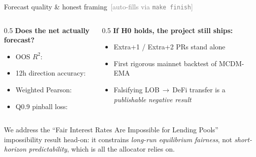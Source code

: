\documentclass[aspectratio=169,11pt]{beamer}
\newcommand{\pending}{\textcolor{gray}{\scriptsize\,[auto-fills via \texttt{make finish}]}}
\begin{document}
\begin{frame}{Forecast quality \& honest framing \pending}
  \begin{columns}[T]
    \begin{column}{0.5\textwidth}
      \textbf{Does the net actually forecast?}
      \begin{itemize}
        \item OOS $R^2$: \ForecastRsq
        \item 12h direction accuracy: \ForecastDirAcc
        \item Weighted Pearson: \ForecastWPearson
        \item Q0.9 pinball loss: \ForecastQNineLoss
      \end{itemize}
    \end{column}
    \begin{column}{0.5\textwidth}
      \textbf{If H0 holds, the project still ships:}
      \begin{itemize}
        \item Extra+1 / Extra+2 PRs stand alone
        \item First rigorous mainnet backtest of MCDM-EMA
        \item Falsifying LOB\,$\to$\,DeFi transfer is a
              \emph{publishable negative result}
      \end{itemize}
    \end{column}
  \end{columns}

  \medskip
  \footnotesize We address the ``Fair Interest Rates Are Impossible for
  Lending Pools'' impossibility result head-on: it constrains
  \emph{long-run equilibrium fairness}, not \emph{short-horizon
  predictability}, which is all the allocator relies on.
\end{frame}
\end{document}
